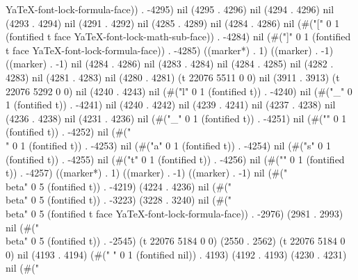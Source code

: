 YaTeX-font-lock-formula-face)) . -4295) nil (4295 . 4296) nil (4294 . 4296) nil (4293 . 4294) nil (4291 . 4292) nil (4285 . 4289) nil (4284 . 4286) nil (#("[" 0 1 (fontified t face YaTeX-font-lock-math-sub-face)) . -4284) nil (#("]" 0 1 (fontified t face YaTeX-font-lock-formula-face)) . -4285) ((marker*) . 1) ((marker) . -1) ((marker) . -1) nil (4284 . 4286) nil (4283 . 4284) nil (4284 . 4285) nil (4282 . 4283) nil (4281 . 4283) nil (4280 . 4281) (t 22076 5511 0 0) nil (3911 . 3913) (t 22076 5292 0 0) nil (4240 . 4243) nil (#("l" 0 1 (fontified t)) . -4240) nil (#("_" 0 1 (fontified t)) . -4241) nil (4240 . 4242) nil (4239 . 4241) nil (4237 . 4238) nil (4236 . 4238) nil (4231 . 4236) nil (#("_" 0 1 (fontified t)) . -4251) nil (#("{" 0 1 (fontified t)) . -4252) nil (#("\\" 0 1 (fontified t)) . -4253) nil (#("a" 0 1 (fontified t)) . -4254) nil (#("s" 0 1 (fontified t)) . -4255) nil (#("t" 0 1 (fontified t)) . -4256) nil (#("}" 0 1 (fontified t)) . -4257) ((marker*) . 1) ((marker) . -1) ((marker) . -1) nil (#("\\beta" 0 5 (fontified t)) . -4219) (4224 . 4236) nil (#("\\beta" 0 5 (fontified t)) . -3223) (3228 . 3240) nil (#("\\beta" 0 5 (fontified t face YaTeX-font-lock-formula-face)) . -2976) (2981 . 2993) nil (#("\\beta" 0 5 (fontified t)) . -2545) (t 22076 5184 0 0) (2550 . 2562) (t 22076 5184 0 0) nil (4193 . 4194) (#(" " 0 1 (fontified nil)) . 4193) (4192 . 4193) (4230 . 4231) nil (#("
